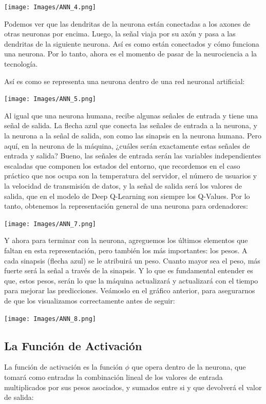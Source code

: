 \documentclass[
]{book}
\begin{document}
\texttt{[image: Images/ANN\_4.png]}

Podemos ver que las dendritas de la neurona están conectadas a los axones de otras neuronas por encima. Luego, la señal viaja por su axón y pasa a las dendritas de la siguiente neurona. Así es como están conectados y cómo funciona una neurona. Por lo tanto, ahora es el momento de pasar de la neurociencia a la tecnología.

Así es como se representa una neurona dentro de una red neuronal artificial:

\texttt{[image: Images/ANN\_5.png]}

Al igual que una neurona humana, recibe algunas señales de entrada y tiene una señal de salida. La flecha azul que conecta las señales de entrada a la neurona, y la neurona a la señal de salida, son como las sinapsis en la neurona humana. Pero aquí, en la neurona de la máquina, ¿cuáles serán exactamente estas señales de entrada y salida? Bueno, las señales de entrada serán las variables independientes escaladas que componen los estados del entorno, que recordemos en el caso práctico que nos ocupa son la temperatura del servidor, el número de usuarios y la velocidad de transmisión de datos, y la señal de salida será los valores de salida, que en el modelo de Deep Q-Learning son siempre los Q-Values. Por lo tanto, obtenemos la representación general de una neurona para ordenadores:

\texttt{[image: Images/ANN\_7.png]}

Y ahora para terminar con la neurona, agreguemos los últimos elementos que faltan en esta representación, pero también los más importantes: los pesos. A cada sinapsis (flecha azul) se le atribuirá un peso. Cuanto mayor sea el peso, más fuerte será la señal a través de la sinapsis. Y lo que es fundamental entender es que, estos pesos, serán lo que la máquina actualizará y actualizará con el tiempo para mejorar las predicciones. Veámoslo en el gráfico anterior, para asegurarnos de que los visualizamos correctamente antes de seguir:

\texttt{[image: Images/ANN\_8.png]}

\hypertarget{la-funciuxf3n-de-activaciuxf3n}{%
\subsection{La Función de Activación}\label{la-funciuxf3n-de-activaciuxf3n}}

La función de activación es la función \(\phi\) que opera dentro de la neurona, que tomará como entradas la combinación lineal de los valores de entrada multiplicados por sus pesos asociados, y sumados entre si y que devolverá el valor de salida:
\end{document}
